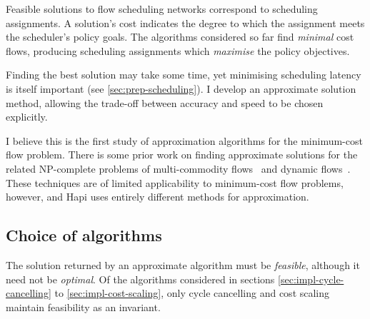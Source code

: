 
Feasible solutions to flow scheduling networks correspond to scheduling assignments. A solution's cost indicates the degree to which the assignment meets the scheduler's policy goals. The algorithms considered so far find \emph{minimal} cost flows, producing scheduling assignments which \emph{maximise} the policy objectives.

Finding the best solution may take some time, yet minimising scheduling latency is itself important (see \cref{sec:prep-scheduling}). I develop an approximate solution method, allowing the trade-off between accuracy and speed to be chosen explicitly.


I believe this is the first study of approximation algorithms for the minimum-cost flow problem. There is some prior work on finding approximate solutions for the related NP-complete problems of multi-commodity flows~\cite{Garg:2007} and dynamic flows~\cite{Hoppe:1994}. These techniques are of limited applicability to minimum-cost flow problems\footnotemark, however, and Hapi uses entirely different methods for approximation.

\subsection{Choice of algorithms} \label{sec:impl-approx-choice}

The solution returned by an approximate algorithm must be \emph{feasible}, although it need not be \emph{optimal}. Of the algorithms considered in sections \ref{sec:impl-cycle-cancelling} to \ref{sec:impl-cost-scaling}, only cycle cancelling and cost scaling maintain feasibility as an invariant\footnotemark.

